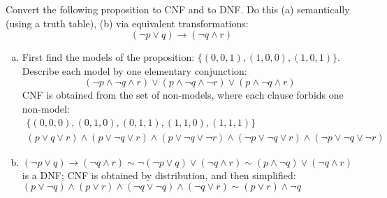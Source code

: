\begin{problem} 
    
    Convert the following proposition to CNF and to DNF. Do this (a) semantically (using a truth table), (b) via equivalent transformations:
    $$
    (\neg p \vee q)\to (\neg q \wedge r)
    $$

    \begin{solution}
        \begin{enumerate}[(a)]
            \item First find the models of the proposition: $\{(0,0,1),(1,0,0),(1,0,1)\}$. Describe each model by one elementary conjunction:
            $$
            (\neg p\land \neg q\land r)\lor
            (p\land \neg q\land \neg r)\lor
            (p\land \neg q\land r)
            $$
            CNF is obtained from the set of non-models, where each clause forbids one non-model:
            \begin{gather*}
                \{(0,0,0),(0,1,0),(0,1,1),(1,1,0),(1,1,1)\}\\
                (p\lor q\lor r)\land
                (p\lor \neg q\lor r)\land
                (p\lor \neg q\lor \neg r)\land
                (\neg p\lor \neg q\lor r)\land
                (\neg p\lor \neg q\lor \neg r)
            \end{gather*} 
            
            \item $(\neg p \vee q)\to (\neg q \wedge r)\sim \neg (\neg p \vee q)\lor (\neg q \wedge r)
            \sim (p \wedge \neg q)\lor (\neg q \wedge r)
            $ is a DNF; CNF is obtained by distribution, and then simplified: $(p\lor \neg q)\land (p\lor r)\land (\neg q\lor\neg q)\land (\neg q\lor r)\sim (p\lor r)\land \neg q$
        \end{enumerate}
            
    \end{solution}
        
\end{problem}


